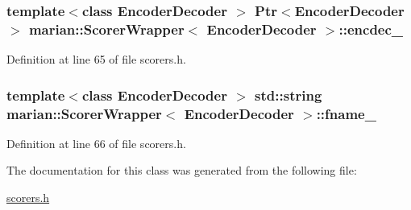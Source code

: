 \subsubsection[{\texorpdfstring{encdec\+\_\+}{encdec_}}]{\setlength{\rightskip}{0pt plus 5cm}template$<$class Encoder\+Decoder $>$ {\bf Ptr}$<${\bf Encoder\+Decoder}$>$ {\bf marian\+::\+Scorer\+Wrapper}$<$ {\bf Encoder\+Decoder} $>$\+::encdec\+\_\+\hspace{0.3cm}{\ttfamily [private]}}\hypertarget{classmarian_1_1ScorerWrapper_a5004443a8f1b1c1c3fc9f061035fac7c}{}\label{classmarian_1_1ScorerWrapper_a5004443a8f1b1c1c3fc9f061035fac7c}


Definition at line 65 of file scorers.\+h.

\subsubsection[{\texorpdfstring{fname\+\_\+}{fname_}}]{\setlength{\rightskip}{0pt plus 5cm}template$<$class Encoder\+Decoder $>$ std\+::string {\bf marian\+::\+Scorer\+Wrapper}$<$ {\bf Encoder\+Decoder} $>$\+::fname\+\_\+\hspace{0.3cm}{\ttfamily [private]}}\hypertarget{classmarian_1_1ScorerWrapper_a6b6ff6dc3052ca52e9d8e66dadb46065}{}\label{classmarian_1_1ScorerWrapper_a6b6ff6dc3052ca52e9d8e66dadb46065}


Definition at line 66 of file scorers.\+h.



The documentation for this class was generated from the following file\+:\begin{DoxyCompactItemize}
\item 
\hyperlink{scorers_8h}{scorers.\+h}\end{DoxyCompactItemize}
